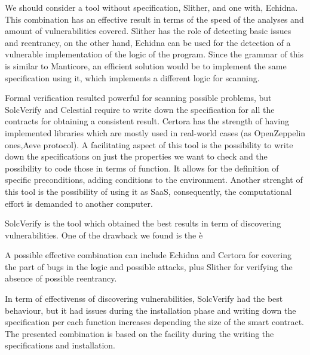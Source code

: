 We should consider a tool without specification, Slither, and one with, Echidna. 
This combination has an effective result in terms of the speed of the analyses and amount of vulnerabilities covered. 
Slither has the role of detecting basic issues and reentrancy, on the other hand, Echidna can be used for the detection of a vulnerable implementation of the logic of the program. 
Since the grammar of this is similar to Manticore, an efficient solution would be to implement the same specification using it, which implements a different logic for scanning. 

Formal verification resulted powerful for scanning possible problems, but SolcVerify and Celestial require to 
write down the specification for all the contracts for obtaining a consistent result. 
Certora has the strength of having implemented libraries which are mostly used in real-world cases (as OpenZeppelin ones,Aeve protocol). 
A facilitating aspect of this tool is the possibility to write down the specifications on just the properties we want to check and 
the possibility to code those in terms of function. It allows for the definition of specific preconditions, adding conditions to the environment. 
Another strenght of this tool is the possibility of using it as SaaS, consequently, the computational effort is demanded to another computer.

SolcVerify is the tool which obtained the best results in term of discovering vulnerabilities. One of the drawback we found is the è

A possible effective combination can include Echidna and Certora for covering the part of bugs in the logic and possible attacks, 
plus Slither for verifying the absence of possible reentrancy. 

In term of effectivenss of discovering vulnerabilities, SolcVerify had the best behaviour, 
but it had issues during the installation phase and writing down the specification per each function increases depending the size of the smart contract.
The presented combination is based on the facility during the writing the specifications and installation.


